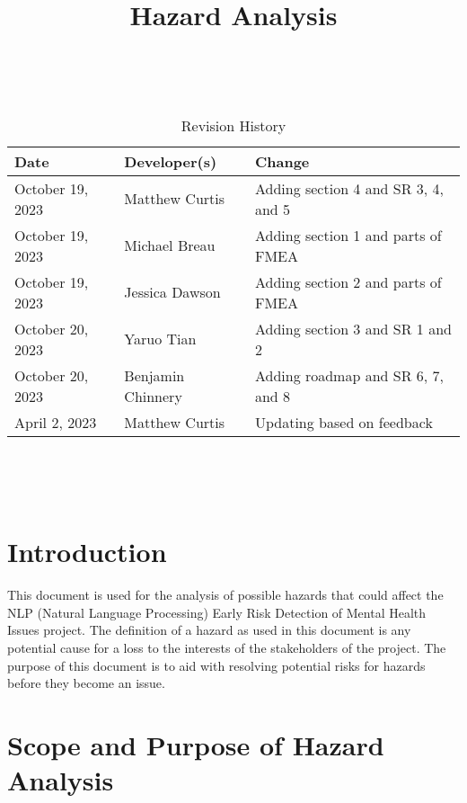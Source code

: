 \documentclass{article}
\title{Hazard Analysis\\\progname}
\author{\authname}
\date{}
\begin{document}
\maketitle
\thispagestyle{empty}


~\newpage






\begin{table}[hp]
\caption{Revision History} \label{TblRevisionHistory}
\begin{tabularx}{\textwidth}{llX}
\toprule
\textbf{Date} & \textbf{Developer(s)} & \textbf{Change}\\
\midrule
October 19, 2023 & Matthew Curtis & Adding section 4 and SR 3, 4, and 5\\
October 19, 2023 & Michael Breau & Adding section 1 and parts of FMEA\\
October 19, 2023 & Jessica Dawson & Adding section 2 and parts of FMEA\\
October 20, 2023 & Yaruo Tian & Adding section 3 and SR 1 and 2\\
October 20, 2023 & Benjamin Chinnery & Adding roadmap and SR 6, 7, and 8\\
April 2, 2023 & Matthew Curtis & Updating based on feedback\\
\bottomrule
\end{tabularx}
\end{table}



~\newpage


\tableofcontents


~\newpage




\section{Introduction}


This document is used for the analysis of possible hazards that could affect the NLP (Natural Language Processing) Early Risk Detection of Mental Health Issues project. The definition of a hazard as used in this document is any potential cause for a loss to the interests of the stakeholders of the project. The purpose of this document is to aid with resolving potential risks for hazards before they become an issue.


\section{Scope and Purpose of Hazard Analysis}
\end{document}
